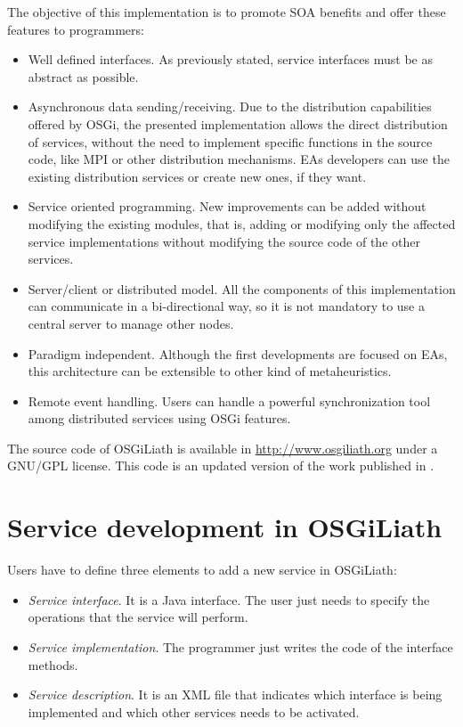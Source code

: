 The objective of this implementation is to promote SOA benefits and offer  these features to programmers:


\begin{itemize}
\item Well defined interfaces. As previously stated, service interfaces must be as abstract as possible.
\item Asynchronous data sending/receiving. Due to the distribution capabilities offered by OSGi, the presented implementation allows the direct distribution of services, without the need to implement specific functions in the source code, like MPI or other distribution mechanisms. EAs developers can use the existing distribution services or create new ones, if they want.
\item Service oriented programming. New improvements can be added without modifying the existing modules, that is, adding or modifying only the affected service implementations without modifying the source code of the other services.
\item Server/client or distributed model. All the components of this implementation can communicate in a bi-directional way, so it is not mandatory to use a central server to manage other nodes.
\item Paradigm independent. Although the first developments are focused on EAs, this architecture can be extensible to other kind of metaheuristics.
\item Remote event handling. Users can handle a
  powerful synchronization tool among distributed services using OSGi features. 
                               
\end{itemize}

The source code of OSGiLiath is available in \url{http://www.osgiliath.org} under a GNU/GPL license. This code is an updated version of the work published in \cite{GarciaSanchezDistributed2010}. 

 
\section{Service development in OSGiLiath}

Users have to define three elements to add a new service in OSGiLiath:


\begin{itemize}
\item {\em Service interface}. It is a Java interface. The user just needs to specify the operations that the service will perform.
\item {\em Service implementation}. The programmer just writes the code of the interface methods.
\item {\em Service description}. It is an XML file that indicates which
  interface is being implemented and which other services needs to be
  activated. 
\end{itemize}

